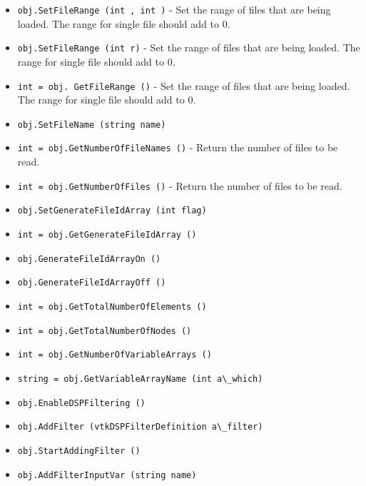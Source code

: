 \begin{itemize}
\item  \verb|obj.SetFileRange (int , int )| -  Set the range of files that are being loaded. The range for single
 file should add to 0.

\item  \verb|obj.SetFileRange (int r)| -  Set the range of files that are being loaded. The range for single
 file should add to 0.

\item  \verb|int = obj. GetFileRange ()| -  Set the range of files that are being loaded. The range for single
 file should add to 0.

\item  \verb|obj.SetFileName (string name)|

\item  \verb|int = obj.GetNumberOfFileNames ()| -    Return the number of files to be read.

\item  \verb|int = obj.GetNumberOfFiles ()| -    Return the number of files to be read.

\item  \verb|obj.SetGenerateFileIdArray (int flag)|

\item  \verb|int = obj.GetGenerateFileIdArray ()|

\item  \verb|obj.GenerateFileIdArrayOn ()|

\item  \verb|obj.GenerateFileIdArrayOff ()|

\item  \verb|int = obj.GetTotalNumberOfElements ()|

\item  \verb|int = obj.GetTotalNumberOfNodes ()|

\item  \verb|int = obj.GetNumberOfVariableArrays ()|

\item  \verb|string = obj.GetVariableArrayName (int a\_which)|

\item  \verb|obj.EnableDSPFiltering ()|

\item  \verb|obj.AddFilter (vtkDSPFilterDefinition a\_filter)|

\item  \verb|obj.StartAddingFilter ()|

\item  \verb|obj.AddFilterInputVar (string name)|


\end{itemize}
